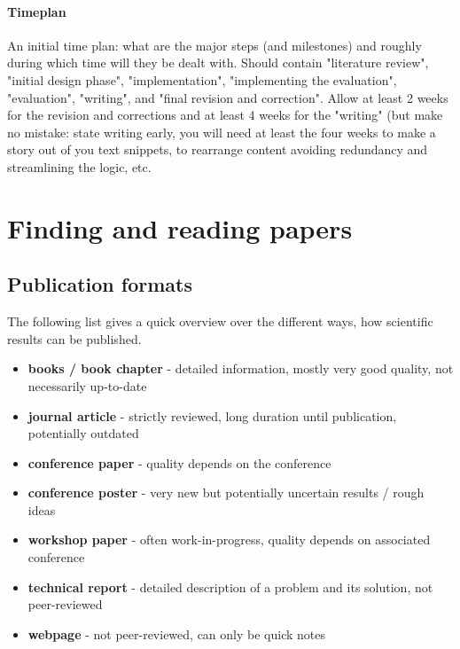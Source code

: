 \documentclass{article}
\begin{document}
\paragraph{Timeplan}
An initial time plan: what are the major steps (and milestones) and roughly during which time will they be dealt with. Should contain "literature review", "initial design phase", "implementation", "implementing the evaluation", "evaluation", "writing", and "final revision and correction". Allow at least 2 weeks for the revision and corrections and at least 4 weeks for the "writing" (but make no mistake: state writing early, you will need at least the four weeks to make a story out of you text snippets, to rearrange content avoiding redundancy and streamlining the logic, etc.










\section{Finding and reading papers}


\subsection{Publication formats}

The following list gives a quick overview over the different ways, how scientific results can be published.

\begin{itemize}
	\item \textbf{books / book chapter} - detailed information, mostly very good quality, not necessarily up-to-date
	\item \textbf{journal article} - strictly reviewed, long duration until publication, potentially outdated
	\item \textbf{conference paper} - quality depends on the conference
	\item \textbf{conference poster} - very new but potentially uncertain results / rough ideas
	\item \textbf{workshop paper} - often work-in-progress, quality depends on associated conference
	\item \textbf{technical report} - detailed description of a problem and its solution, not peer-reviewed
	\item \textbf{webpage} - not peer-reviewed, can only be quick notes
\end{itemize}
\end{document}
